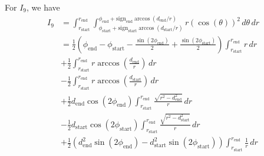 \documentclass{article}
\numberwithin{equation}{section}
\begin{document}
For $I_9$, we have 
\begin{equation}
\begin{split}
    I_9  & = \int_{r_\mathrm{start}}^{r_\mathrm{end}} \int_{\phi_\mathrm{start} + \mathrm{sign}_\mathrm{start}\arccos\left(d_\mathrm{start}/r\right)}^{\phi_\mathrm{end} + \mathrm{sign}_\mathrm{end}\arccos\left(d_\mathrm{end}/r\right)} r(\cos(\theta))^2 \, d\theta \, dr \\
    & = \frac{1}{2}(\phi_\mathrm{end} - \phi_\mathrm{start} - \frac{\sin(2\phi_\mathrm{end})}{2} + \frac{\sin(2\phi_\mathrm{start})}{2}) \int_{r_\mathrm{start}}^{r_\mathrm{end}} r \, dr \\
    & + \frac{1}{2}\int_{r_\mathrm{start}}^{r_\mathrm{end}} r\arccos\left(\frac{d_\mathrm{end}}{r}\right)\, dr \\ 
    & - \frac{1}{2}\int_{r_\mathrm{start}}^{r_\mathrm{end}} r\arccos\left(\frac{d_\mathrm{start}}{r}\right)\, dr \\ 
    & + \frac{1}{2}d_\mathrm{end}\cos(2\phi_\mathrm{end}) \int_{r_\mathrm{start}}^{r_\mathrm{end}} \frac{\sqrt{r^2-d_\mathrm{end}^2}}{r}\, dr \\
    & - \frac{1}{2}d_\mathrm{start}\cos(2\phi_\mathrm{start}) \int_{r_\mathrm{start}}^{r_\mathrm{end}} \frac{\sqrt{r^2-d_\mathrm{start}^2}}{r}\, dr \\
    & + \frac{1}{2}(d_\mathrm{end}^2\sin(2\phi_\mathrm{end}) - d_\mathrm{start}^2\sin(2\phi_\mathrm{start})) \int_{r_\mathrm{start}}^{r_\mathrm{end}} \frac{1}{r} \, dr \\ 
\end{split}
\end{equation}
\end{document}
